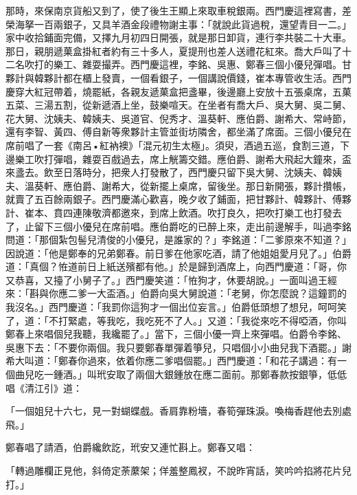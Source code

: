 那時，來保南京貨船又到了，使了後生王顯上來取車稅銀兩。西門慶這裡寫書，差榮海拏一百兩銀子，又具羊酒金段禮物謝主事：「就說此貨過稅，還望青目一二。」家中收拾鋪面完備，又擇九月初四日開張，就是那日卸貨，連行李共裝二十大車。那日，親朋遞菓盒掛紅者約有三十多人，夏提刑也差人送禮花紅來。喬大戶叫了十二名吹打的樂工、雜耍撮弄。西門慶這裡，李銘、吳惠、鄭春三個小優兒彈唱。甘夥計與韓夥計都在櫃上發賣，一個看銀子，一個講說價錢，崔本專管收生活。西門慶穿大紅冠帶着，燒罷紙，{}各親友遞菓盒把盞畢，後邊廳上安放十五張桌席，五菓五菜、三湯五割，從新遞酒上坐，鼓樂喧天。在坐者有喬大戶、吳大舅、吳二舅、花大舅、沈姨夫、韓姨夫、吳道官、倪秀才、溫葵軒、應伯爵、謝希大、常峙節，還有李智、黃四、傅自新等衆夥計主管並街坊隣舍，都坐滿了席面。三個小優兒在席前唱了一套《南呂•紅衲襖》「混元初生太極」。{}須臾，酒過五巡，食割三道，下邊樂工吹打彈唱，雜耍百戲過去，席上觥籌交錯。應伯爵、謝希大飛起大鐘來，盃來盞去。飲至日落時分，把衆人打發散了，西門慶只留下吳大舅、沈姨夫、韓姨夫、溫葵軒、應伯爵、謝希大，從新擺上桌席，留後坐。那日新開張，夥計攢帳，就賣了五百餘兩銀子。西門慶滿心歡喜，晚夕收了鋪面，把甘夥計、韓夥計、傅夥計、崔本、賁四連陳敬濟都邀來，到席上飲酒。吹打良久，把吹打樂工也打發去了，止留下三個小優兒在席前唱。應伯爵吃的已醉上來，走出前邊解手，叫過李銘問道：「那個紮包髻兒清俊的小優兒，是誰家的？」李銘道：「二爹原來不知道？」因說道：「他是鄭奉的兄弟鄭春。前日爹在他家吃酒，請了他姐姐愛月兒了。」伯爵道：「真個？恠道前日上紙送殯都有他。」於是歸到酒席上，向西門慶道：「哥，你又恭喜，又擡了小舅子了。」西門慶笑道：「恠狗才，休要胡說。」一面叫過王經來：「斟與你應二爹一大盃酒。」伯爵向吳大舅說道：「老舅，你怎麼說？這鐘罰的我沒名。」西門慶道：「我罰你這狗才一個出位妄言。」伯爵低頭想了想兒，呵呵笑了，道：「不打緊處，等我吃，我吃死不了人。」又道：「我從來吃不得啞酒，你叫鄭春上來唱個兒我聽，我纔罷了。」當下，三個小優一齊上來彈唱。伯爵令李銘、吳惠下去：「不要你兩個。我只要鄭春單彈着箏兒，只唱個小小曲兒我下酒罷。」{}謝希大叫道：「鄭春你過來，依着你應二爹唱個罷。」西門慶道：「和花子講過：有一個曲兒吃一鍾酒。」叫玳安取了兩個大銀鍾放在應二面前。那鄭春款按銀箏，低低唱《清江引》道：{}

\begin{myquote}
「一個姐兒十六七，見一對蝴蝶戲。香肩靠粉墻，春筍彈珠淚。喚梅香趕他去別處飛。」
\end{myquote}

鄭春唱了請酒，伯爵纔飲訖，玳安又連忙斟上。鄭春又唱：

\begin{myquote}
「轉過雕欄正見他，斜倚定荼䕷架；佯羞整鳳衩，不說昨宵話，笑吟吟掐將花片兒打。」{}
\end{myquote}

